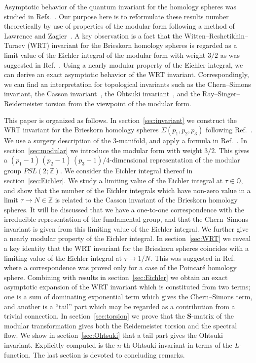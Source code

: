 \documentclass[12pt,reqno]{amsart}
\numberwithin{equation}{section}
\begin{document}
Asymptotic behavior of the quantum invariant for the homology spheres was
studied in
Refs.~.
Our purpose here  is to reformulate these results
number theoretically by use of properties of the
modular form following a method  of Lawrence and
Zagier~\cite{LawrZagi99a}.
A key observation is a fact that the Witten--Reshetikhin--Turaev (WRT)
invariant for the Brieskorn homology spheres is regarded as a limit
value of the Eichler integral of the modular form with weight $3/2$ as
was suggested in Ref.~.
Using a nearly modular property of the Eichler integral, we can derive
an exact asymptotic behavior of the WRT invariant.
Correspondingly,
we can find an interpretation for topological  invariants such as the
Chern--Simons invariant,
the Casson invariant~\cite{KWalk92a},
the Ohtsuki invariant~\cite{HMuraka93a,HMuraka95a,Ohtsu95b,TOhtsu96a},
and the Ray--Singer--Reidemeister torsion
from the viewpoint of the modular form.

This paper is organized as follows.
In section~\ref{sec:invariant} we construct the WRT
invariant for the Brieskorn homology spheres
$\Sigma(p_1,p_2,p_3)$
following Ref.~.
We use a surgery description of the 3-manifold, and apply
a formula in Ref.~.
In section~\ref{sec:modular} we introduce the modular form with weight $3/2$.
This gives
a $(p_1-1) \, (p_2 -1 ) \, (p_3 -1)/4$-dimensional representation of the
modular group $PSL(2;\mathbb{Z})$.
We consider the Eichler integral thereof in section~\ref{sec:Eichler}.
We study a limiting value of the Eichler integral at $\tau\in \mathbb{Q}$,
and show that the number of the Eichler integrals
which have non-zero value in a limit
$\tau\to N\in\mathbb{Z}$
is related to the Casson invariant of the Brieskorn homology spheres.
It will be discussed 
that we have a one-to-one correspondence with the irreducible representation of the fundamental group,
and that the Chern--Simons invariant is given from this
limiting value of the Eichler integral.
We further give a nearly modular property of the Eichler integral.
In section~\ref{sec:WRT}
we reveal a key identity that the WRT invariant for the Brieskorn spheres coincides with
a limiting value of the Eichler integral at $\tau\to 1/N$.
This was suggested in Ref.~
where  a correspondence was proved only
for a case of the Poincar{\'e} homology sphere.
Combining with  results in section~\ref{sec:Eichler} we obtain an exact
asymptotic expansion of the WRT invariant
which is constituted from two terms;
one is a sum of dominating exponential term which gives the Chern--Simons term,
and another  is a ``tail''  part which may be regarded as a contribution from a trivial connection.
In section~\ref{sec:torsion} we prove that the $\mathbf{S}$-matrix
of the modular transformation gives 
both the Reidemeister torsion and
the spectral flow.
We show in section~\ref{sec:Ohtsuki} that a tail part gives the Ohtsuki invariant.
Explicitly computed is the $n$-th Ohtsuki invariant in terms of the $L$-function.
The last section is devoted to  concluding remarks.
\end{document}
